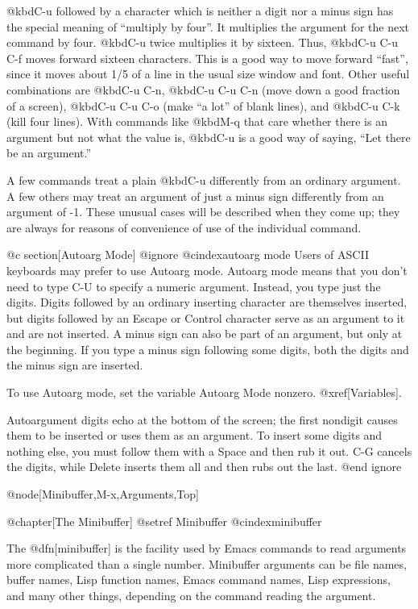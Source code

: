 {{{{  @kbd{C-u} followed by a character which is neither a digit nor a minus
sign has the special meaning of ``multiply by four''.  It multiplies the
argument for the next command by four.  @kbd{C-u} twice multiplies it by
sixteen.  Thus, @kbd{C-u C-u C-f} moves forward sixteen characters.  This
is a good way to move forward ``fast'', since it moves about 1/5 of a line
in the usual size window and font.  Other useful combinations are @kbd{C-u
C-n}, @kbd{C-u C-u C-n} (move down a good fraction of a screen), @kbd{C-u
C-u C-o} (make ``a lot'' of blank lines), and @kbd{C-u C-k} (kill four
lines).  With commands like @kbd{M-q} that care whether there is an
argument but not what the value is, @kbd{C-u} is a good way of saying,
``Let there be an argument.''

  A few commands treat a plain @kbd{C-u} differently from an ordinary
argument.  A few others may treat an argument of just a minus sign
differently from an argument of -1.  These unusual cases will be described
when they come up; they are always for reasons of convenience of use of the
individual command.

@c section[Autoarg Mode]
@ignore
@cindex{autoarg mode}
  Users of ASCII keyboards may prefer to use Autoarg mode.  Autoarg mode
means that you don't need to type C-U to specify a numeric argument.
Instead, you type just the digits.  Digits followed by an ordinary
inserting character are themselves inserted, but digits followed by an
Escape or Control character serve as an argument to it and are not
inserted.  A minus sign can also be part of an argument, but only at the
beginning.  If you type a minus sign following some digits, both the digits
and the minus sign are inserted.

  To use Autoarg mode, set the variable Autoarg Mode nonzero.
@xref[Variables].

  Autoargument digits echo at the bottom of the screen; the first nondigit
causes them to be inserted or uses them as an argument.  To insert some
digits and nothing else, you must follow them with a Space and then rub it
out.  C-G cancels the digits, while Delete inserts them all and then rubs
out the last.
@end ignore

@node[Minibuffer,M-x,Arguments,Top]

@chapter[The Minibuffer]
@setref Minibuffer
@cindex{minibuffer}

  The @dfn[minibuffer] is the facility used by Emacs commands to read
arguments more complicated than a single number.  Minibuffer arguments can
be file names, buffer names, Lisp function names, Emacs command
names, Lisp expressions, and many other things, depending on the command
reading the argument.

}}}}
